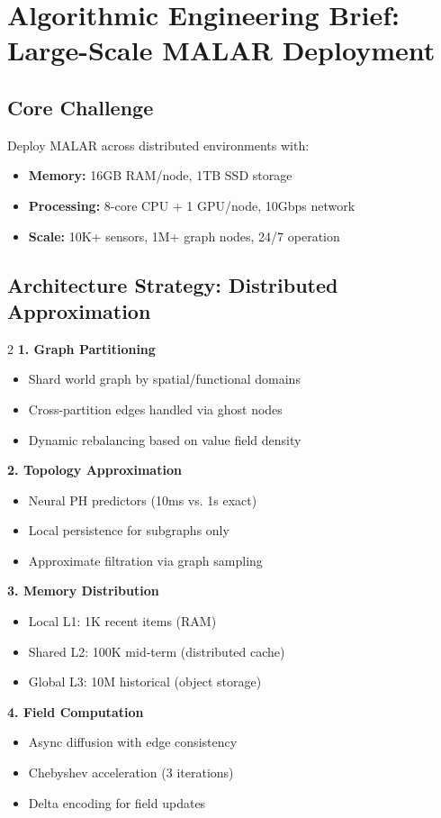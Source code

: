 \documentclass[11pt,english]{article}
\theoremstyle{remark}
\begin{document}
	
	\section*{Algorithmic Engineering Brief: Large-Scale MALAR Deployment}
	
	\subsection*{Core Challenge}
	Deploy MALAR across distributed environments with:
	\begin{itemize}
		\item \textbf{Memory:} 16GB RAM/node, 1TB SSD storage
		\item \textbf{Processing:} 8-core CPU + 1 GPU/node, 10Gbps network
		\item \textbf{Scale:} 10K+ sensors, 1M+ graph nodes, 24/7 operation
	\end{itemize}
	
	\subsection*{Architecture Strategy: Distributed Approximation}
	\begin{multicols}{2}
		\textbf{1. Graph Partitioning}
		\begin{itemize}
			\item Shard world graph by spatial/functional domains
			\item Cross-partition edges handled via ghost nodes
			\item Dynamic rebalancing based on value field density
		\end{itemize}
		
		\textbf{2. Topology Approximation}
		\begin{itemize}
			\item Neural PH predictors (10ms vs. 1s exact)
			\item Local persistence for subgraphs only
			\item Approximate filtration via graph sampling
		\end{itemize}
		
		\textbf{3. Memory Distribution}
		\begin{itemize}
			\item Local L1: 1K recent items (RAM)
			\item Shared L2: 100K mid-term (distributed cache)
			\item Global L3: 10M historical (object storage)
		\end{itemize}
		
		\textbf{4. Field Computation}
		\begin{itemize}
			\item Async diffusion with edge consistency
			\item Chebyshev acceleration (3 iterations)
			\item Delta encoding for field updates
		\end{itemize}
	\end{multicols}
	
\end{document}
